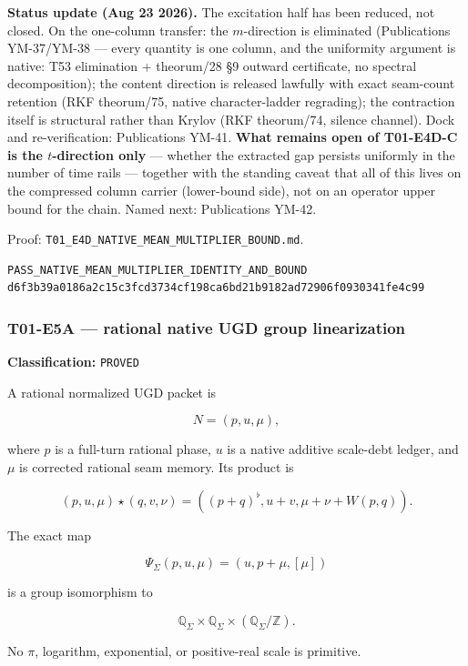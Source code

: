 \textbf{Status update (Aug 23 2026).} The excitation half has been reduced,
not closed. On the one-column transfer: the \(m\)-direction is
eliminated (Publications YM-37/YM-38 --- every quantity is one column, and
the uniformity argument is native: T53 elimination + theorum/28 §9
outward certificate, no spectral decomposition); the content direction is
released lawfully with exact seam-count retention (RKF theorum/75, native
character-ladder regrading); the contraction itself is structural rather
than Krylov (RKF theorum/74, silence channel). Dock and re-verification:
Publications YM-41. \textbf{What remains open of T01-E4D-C is the
\(t\)-direction only} --- whether the extracted gap persists uniformly in
the number of time rails --- together with the standing caveat that all of
this lives on the compressed column carrier (lower-bound side), not on
an operator upper bound for the chain. Named next: Publications YM-42.

Proof:
\texttt{T01\_E4D\_NATIVE\_MEAN\_MULTIPLIER\_BOUND.md}.

\begin{verbatim}
PASS_NATIVE_MEAN_MULTIPLIER_IDENTITY_AND_BOUND
d6f3b39a0186a2c15c3fcd3734cf198ca6bd21b9182ad72906f0930341fe4c99
\end{verbatim}

\hypertarget{t01-e5a-rational-native-ugd-group-linearization}{%
\subsubsection{T01-E5A --- rational native UGD group linearization}\label{t01-e5a-rational-native-ugd-group-linearization}}

\textbf{Classification:} \texttt{PROVED}

A rational normalized UGD packet is

\[
N=(p,u,\mu),
\]

where \(p\) is a full-turn rational phase, \(u\) is a native additive
scale-debt ledger, and \(\mu\) is corrected rational seam memory. Its product is

\[
(p,u,\mu)\star(q,v,\nu)
=
((p+q)^\flat,u+v,\mu+\nu+W(p,q)).
\]

The exact map

\[
\Psi_\Sigma(p,u,\mu)
=(u,p+\mu,[\mu])
\]

is a group isomorphism to

\[
\mathbb Q_\Sigma\times\mathbb Q_\Sigma
\times(\mathbb Q_\Sigma/\mathbb Z).
\]

No \(\pi\), logarithm, exponential, or positive-real scale is primitive.

